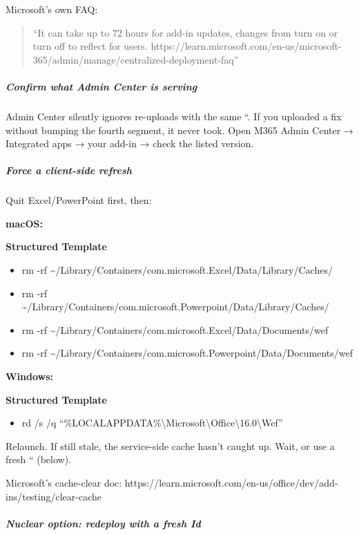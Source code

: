 \documentclass[11pt]{article}
\begin{document}
Microsoft's own FAQ:

\begin{quote}
``It can take up to 72 hours for add-in updates, changes from turn on or turn off to reflect for users. https://learn.microsoft.com/en-us/microsoft-365/admin/manage/centralized-deployment-faq''
\end{quote}

\subparagraph{Confirm what Admin Center is serving}\mbox{}\par

Admin Center silently ignores re-uploads with the same ``. If you uploaded a fix without bumping the fourth segment, it never took. Open M365 Admin Center → Integrated apps → your add-in → check the listed version.


\subparagraph{Force a client-side refresh}\mbox{}\par

Quit Excel/PowerPoint first, then:


\textbf{macOS:}

\textbf{Structured Template}
\begin{itemize}[leftmargin=*,itemsep=2pt,topsep=2pt]
\item {} rm -rf \textasciitilde{}/Library/Containers/com.microsoft.Excel/Data/Library/Caches/
\item {} rm -rf \textasciitilde{}/Library/Containers/com.microsoft.Powerpoint/Data/Library/Caches/
\item {} rm -rf \textasciitilde{}/Library/Containers/com.microsoft.Excel/Data/Documents/wef
\item {} rm -rf \textasciitilde{}/Library/Containers/com.microsoft.Powerpoint/Data/Documents/wef
\end{itemize}

\textbf{Windows:}

\textbf{Structured Template}
\begin{itemize}[leftmargin=*,itemsep=2pt,topsep=2pt]
\item {} rd /s /q ``\%LOCALAPPDATA\%\textbackslash{}Microsoft\textbackslash{}Office\textbackslash{}16.0\textbackslash{}Wef''
\end{itemize}

Relaunch. If still stale, the service-side cache hasn't caught up. Wait, or use a fresh `` (below).


Microsoft's cache-clear doc: https://learn.microsoft.com/en-us/office/dev/add-ins/testing/clear-cache


\subparagraph{Nuclear option: redeploy with a fresh Id}\mbox{}\par
\end{document}
